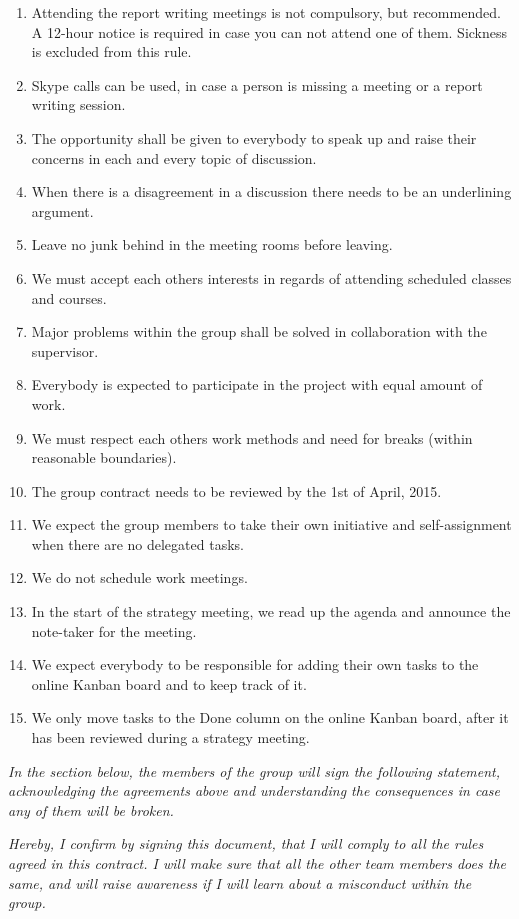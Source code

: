 \begin{enumerate}
	\item Attending the report writing meetings is not compulsory, but recommended. A 12-hour notice is required in case you can not attend one of them. Sickness is excluded from this rule.
	\item Skype calls can be used, in case a person is missing a meeting or a report writing session.
	\item The opportunity shall be given to everybody to speak up and raise their concerns in each and every topic of discussion.
	\item When there is a disagreement in a discussion there needs to be an underlining argument.
	\item Leave no junk behind in the meeting rooms before leaving.
	\item We must accept each others interests in regards of attending scheduled classes and courses.
	\item Major problems within the group shall be solved in collaboration with the supervisor.
	\item Everybody is expected to participate in the project with equal amount of work.
	\item We must respect each others work methods and need for breaks (within reasonable boundaries).
	\item The group contract needs to be reviewed by the 1st of April, 2015.
	\item We expect the group members to take their own initiative and self-assignment when there are no delegated tasks.
	\item We do not schedule work meetings.
	\item In the start of the strategy meeting, we read up the agenda and announce the note-taker for the meeting.
	\item We expect everybody to be responsible for adding their own tasks to the online Kanban board and to keep track of it.
	\item We only move tasks to the Done column on the online Kanban board, after it has been reviewed during a strategy meeting.
\end{enumerate}

\textit{In the section below, the members of the group will sign the following statement, acknowledging the agreements above and understanding the consequences in case any of them will be broken.}

\textit{Hereby, I confirm by signing this document, that I will comply to all the rules agreed in this contract. I will make sure that all the other team members does the same, and will raise awareness if I will learn about a misconduct within the group.}

